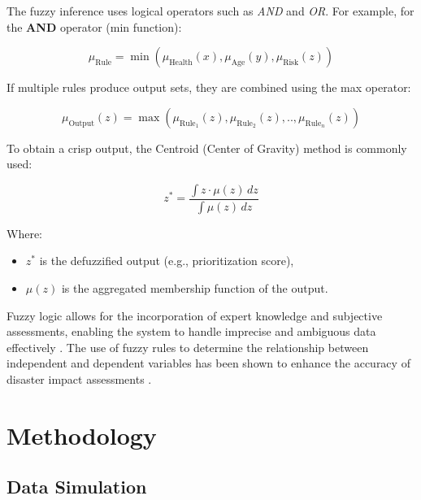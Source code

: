 \documentclass[journal,final,a4paper,twoside,11pt]{IEEEtran}
\begin{document}
The fuzzy inference uses logical operators such as \textit{AND} and \textit{OR}. For example, for the \textbf{AND} operator (min function):

\[
\mu_{\text{Rule}} = \min\left( \mu_{\text{Health}}(x), \mu_{\text{Age}}(y), \mu_{\text{Risk}}(z) \right)
\]

If multiple rules produce output sets, they are combined using the max operator:

\[
\mu_{\text{Output}}(z) = \max \left( \mu_{\text{Rule}_1}(z), \mu_{\text{Rule}_2}(z),.., \mu_{\text{Rule}_n}(z) \right)
\]

To obtain a crisp output, the Centroid (Center of Gravity) method is commonly used:

\[
z^* = \frac{\int z \cdot \mu(z) \, dz}{\int \mu(z) \, dz}
\]

Where:
\begin{itemize}
    \item \( z^* \) is the defuzzified output (e.g., prioritization score),
    \item \( \mu(z) \) is the aggregated membership function of the output.
\end{itemize}

Fuzzy logic allows for the incorporation of expert knowledge and subjective assessments, enabling the system to handle imprecise and ambiguous data effectively \cite{jain2020membership}. The use of fuzzy rules to determine the relationship between independent and dependent variables has been shown to enhance the accuracy of disaster impact assessments \cite{yoon2023novel}.


\section{Methodology}
\subsection{Data Simulation}
\end{document}
